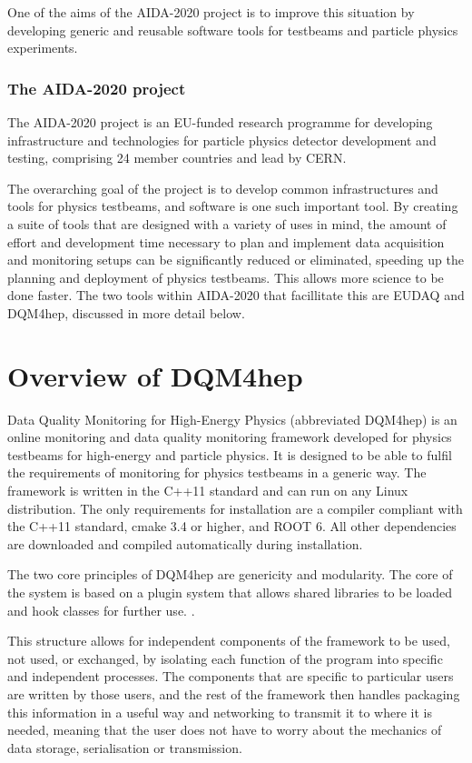 One of the aims of the AIDA-2020 project is to improve this situation by developing generic and reusable software tools for testbeams and particle physics experiments.

\subsubsection{The AIDA-2020 project}
The AIDA-2020 project is an EU-funded research programme for developing infrastructure and technologies for particle physics detector development and testing, comprising 24 member countries and lead by CERN.

The overarching goal of the project is to develop common infrastructures and tools for physics testbeams, and software is one such important tool. By creating a suite of tools that are designed with a variety of uses in mind, the amount of effort and development time necessary to plan and implement data acquisition and monitoring setups can be significantly reduced or eliminated, speeding up the planning and deployment of physics testbeams. This allows more science to be done faster. The two tools within AIDA-2020 that facillitate this are EUDAQ and DQM4hep, discussed in more detail below.

\section{Overview of DQM4hep}
Data Quality Monitoring for High-Energy Physics (abbreviated DQM4hep) is an online monitoring and data quality monitoring framework developed for physics testbeams for high-energy and particle physics. It is designed to be able to fulfil the requirements of monitoring for physics testbeams in a generic way. The framework is written in the C++11 standard and can run on any Linux distribution. The only requirements for installation are a compiler compliant with the C++11 standard, cmake 3.4 or higher, and ROOT 6. All other dependencies are downloaded and compiled automatically during installation. 

The two core principles of DQM4hep are genericity and modularity. The core of the system is based on a plugin system that allows shared libraries to be loaded and hook classes for further use. \cite{aida2020-milestone-dqm4hep}. 

This structure allows for independent components of the framework to be used, not used, or exchanged, by isolating each function of the program into specific and independent processes. The components that are specific to particular users are written by those users, and the rest of the framework then handles packaging this information in a useful way and networking to transmit it to where it is needed, meaning that the user does not have to worry about the mechanics of data storage, serialisation or transmission. 

